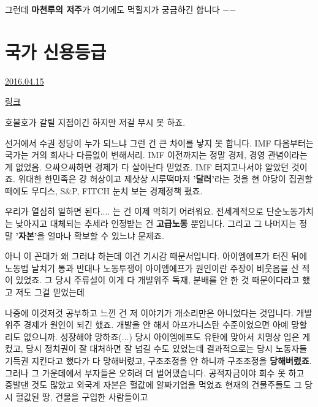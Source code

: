 그런데 \textbf{마천루의 저주}가 여기에도 먹힐지가 궁금하긴 합니다 $-$$-$
\vspace{5mm}








\section{국가 신용등급}
\href{https://www.kockoc.com/Apoc/730632}{2016.04.15}

\vspace{5mm}

\href{http://news.naver.com/main/read.nhn?mode=LSD&mid=sec&sid1=101&oid=014&aid=0003634715}{링크}
\vspace{5mm}

호불호가 갈릴 지점이긴 하지만 저걸 무시 못 하죠.
\vspace{5mm}

선거에서 수권 정당이 누가 되느냐 그런 건 큰 차이를 낳지 못 합니다.
IMF 다음부터는 국가는 거의 회사나 다름없이 변해서리.
IMF 이전까지는 정말 경제, 경영 관념이라는 게 없었음. 으싸으싸하면 경제가 다 살아난다 믿었죠.
IMF 터지고나서야 알았던 것이죠. 위대한 한민족은 걍 허상이고 제삿상 시루떡마저 \textbf{'달러'}라는 것을
현 야당이 집권할 때에도 무디스, S$\&$P, FITCH 눈치 보는 경제정책 폈죠.
\vspace{5mm}

우리가 열심히 일하면 된다.... 는 건 이제 먹히기 어려워요. 전세계적으로 단순노동가치는 낮아지고 대체되는 추세라
인정받는 건 \textbf{고급노동} 뿐입니다. 그리고 그 나머지는 정말 \textbf{'자본'}을 얼마나 확보할 수 있느냐 문제죠.
\vspace{5mm}

아니 이 꼰대가 왜 그러냐 하는데 이건 기시감 때문서입니다.
아이엠에프가 터진 뒤에 노동법 날치기 통과 반대나 노동투쟁이 아이엠에프가 원인이란 주장이 비웃음을 산 적이 있었죠.
그 당시 주류설이 이게 다 개발위주 독재, 분배를 안 한 것 때문이다라고 했고 저도 그걸 믿었는데
\vspace{5mm}

나중에 이것저것 공부하고 느낀 건 저 이야기가 개소리만은 아니었다는 것입니다.
개발위주 경제가 원인이 되긴 했죠. 개발을 안 해서 아프가니스탄 수준이었으면 아예 망할 리도 없으니까. 성장해야 망하죠(...)
당시 아이엠에프도 유탄에 맞아서 치명상 입은 게 컸고, 당시 정치권이 잘 대처하면 잘 넘길 수도 있었는데
결과적으로는 당시 노동자들 기득권 지킨다고 했다가 다 망해버렸고, 구조조정을 안 하니까 구조조정을 \textbf{당해버렸죠}.
그러나 그 가운데에서 부자들은 오히려 더 벌어댔습니다.
공적자금이야 회수 못 하고 증발댄 것도 많았고 외국계 자본은 헐값에 알짜기업을 먹었죠
현재의 건물주들도 그 당시 헐값된 땅, 건물을 구입한 사람들이고
\vspace{5mm}

